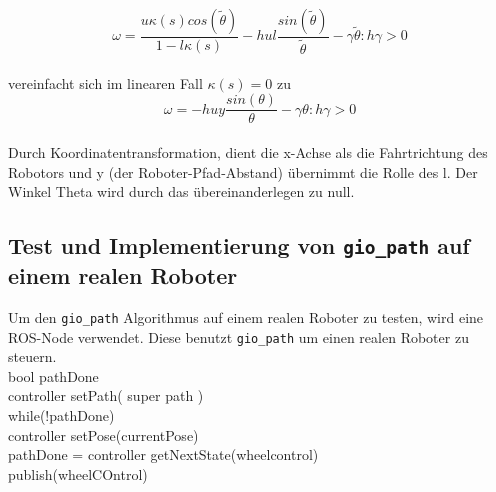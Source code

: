 \documentclass[11pt,a4paper]{article}
\begin{document}
{\begin{equation}
 \omega=  \frac{u \kappa(s) cos(\tilde{\theta})}{1-l \kappa(s)}-h u l  \frac{sin(\tilde{\theta})}{\tilde{\theta}}-\gamma\tilde{\theta} :h\gamma > 0
\end{equation}\\

vereinfacht sich im linearen Fall $\kappa(s)=0$ zu \\

\begin{equation}
\omega= -h u y  \frac{sin(\theta)}{\theta}-\gamma\theta :h\gamma > 0
\end{equation}\\



Durch Koordinatentransformation, dient die x-Achse als die Fahrtrichtung des Robotors  und y (der Roboter-Pfad-Abstand) \"ubernimmt die Rolle des l. Der Winkel Theta wird durch das \"ubereinanderlegen zu null.




\subsection{Test und Implementierung von \texttt{gio\_path} auf einem realen Roboter}

Um den \texttt{gio\_path} Algorithmus auf einem realen Roboter zu testen, wird eine ROS-Node verwendet. Diese benutzt  \texttt{gio\_path} um einen realen Roboter zu steuern.
\\

  bool pathDone\\
  controller setPath( super path ) \\
  while(!pathDone)                  \\
	  controller setPose(currentPose)\\
	  pathDone = controller getNextState(wheelcontrol) \\
	  publish(wheelCOntrol)
\\

}
\end{document}
